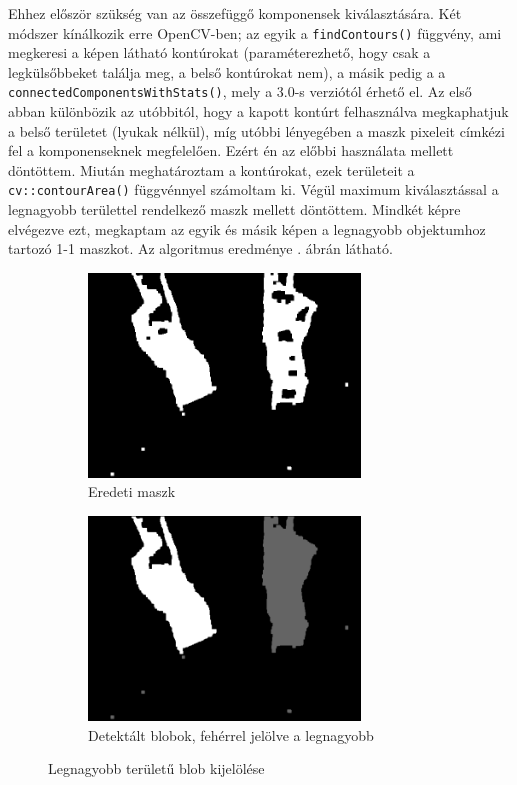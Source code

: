 Ehhez először szükség van az összefüggő komponensek kiválasztására. Két módszer kínálkozik erre OpenCV-ben; az egyik a \texttt{findContours()} függvény, ami megkeresi a képen látható kontúrokat (paraméterezhető, hogy csak a legkülsőbbeket találja meg, a belső kontúrokat nem), a másik pedig a a \texttt{connectedComponentsWithStats()}, mely a 3.0-s verziótól érhető el. Az első abban különbözik az utóbbitól, hogy a kapott kontúrt felhasználva megkaphatjuk a belső területet (lyukak nélkül), míg utóbbi lényegében a maszk pixeleit címkézi fel a komponenseknek megfelelően. Ezért én az előbbi használata mellett döntöttem. Miután meghatároztam a kontúrokat, ezek területeit a \texttt{cv::contourArea()} függvénnyel számoltam ki. Végül maximum kiválasztással a legnagyobb területtel rendelkező maszk mellett döntöttem. Mindkét képre elvégezve ezt, megkaptam az egyik és másik képen a legnagyobb objektumhoz tartozó 1-1 maszkot. Az algoritmus eredménye . ábrán látható.

\begin{figure}[tbh]
\centering
\begin{subfigure}[b]{.49\linewidth}
	\centering
	\includegraphics[width=205pt]{figures/mask_ofmask_104.png}
	\caption{Eredeti maszk}
  \end{subfigure}
\begin{subfigure}[b]{.49\linewidth}
	\centering
	\includegraphics[width=205pt]{figures/mask_ofmask_104_selected.png}
	\caption{Detektált blobok, fehérrel jelölve a legnagyobb}
  \end{subfigure}
\caption{Legnagyobb területű blob kijelölése \label{fig:single-obj}}
\end{figure}

